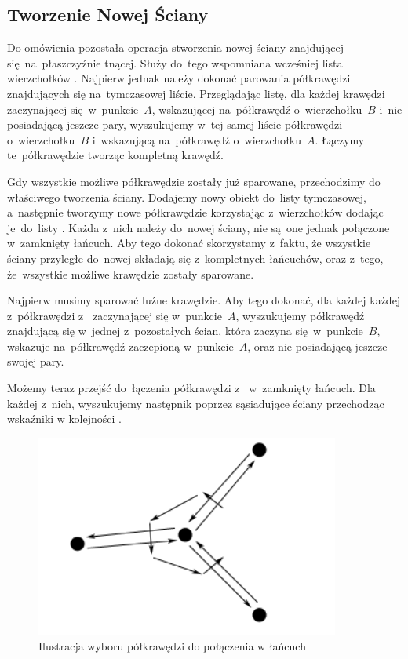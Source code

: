 \documentclass[skorowidz,autorrok,backref,xodstep,oswiadczenie]{wmimgr}
\begin{document}
\subsection{Tworzenie Nowej Ściany}

Do omówienia pozostała operacja stworzenia nowej ściany znajdującej się~na~płaszczyźnie tnącej. Służy do~tego wspomniana wcześniej lista wierzchołków . Najpierw jednak należy dokonać parowania półkrawędzi znajdujących się na~tymczasowej liście. Przeglądając listę, dla każdej krawędzi zaczynającej się~w~punkcie~$A$, wskazującej na~półkrawędź o~wierzchołku~$B$ i~nie posiadającą jeszcze pary, wyszukujemy w~tej samej liście półkrawędzi o~wierzchołku~$B$ i~wskazującą na~półkrawędź o~wierzchołku~$A$. Łączymy te~półkrawędzie tworząc kompletną krawędź.

Gdy wszystkie możliwe półkrawędzie zostały już sparowane, przechodzimy do właściwego tworzenia ściany. Dodajemy nowy obiekt  do~listy tymczasowej, a~następnie tworzymy nowe półkrawędzie korzystając z~wierzchołków  dodając je~do~listy . Każda z~nich należy do~nowej ściany, nie są~one jednak połączone w~zamknięty łańcuch. Aby tego dokonać skorzystamy z~faktu, że wszystkie ściany przyległe do~nowej składają się z~kompletnych łańcuchów, oraz z~tego, że~wszystkie możliwe krawędzie zostały sparowane.

Najpierw musimy sparować luźne krawędzie. Aby tego dokonać, dla każdej każdej z~półkrawędzi z~ zaczynającej się w~punkcie~$A$, wyszukujemy półkrawędź znajdującą się w~jednej z~pozostałych ścian, która zaczyna się~w~punkcie~$B$, wskazuje na~półkrawędź zaczepioną w~punkcie~$A$, oraz nie posiadającą jeszcze swojej pary.

Możemy teraz przejść do~łączenia półkrawędzi z~ w~zamknięty łańcuch. Dla każdej z~nich, wyszukujemy następnik poprzez sąsiadujące ściany przechodząc wskaźniki w kolejności .

\begin{figure}[ht!]
\centering
\includegraphics[width=100mm]{images/chain.png}
\caption{Ilustracja wyboru półkrawędzi do połączenia w łańcuch}
\label{chain}
\end{figure}
\end{document}
